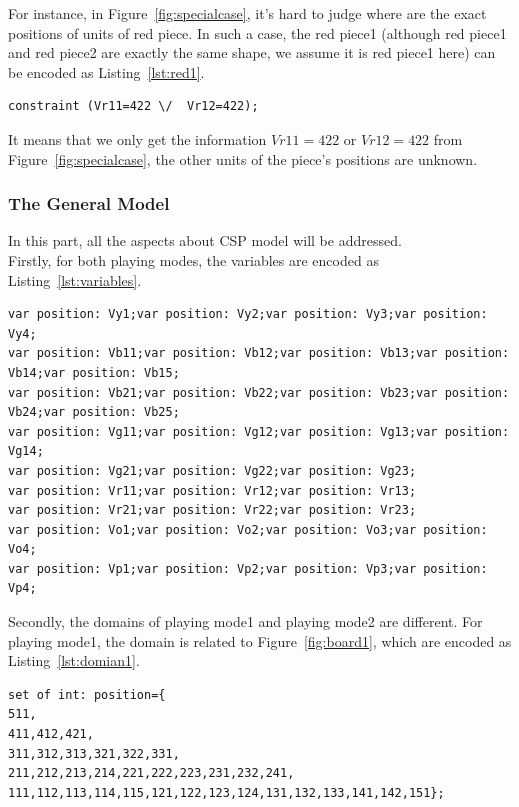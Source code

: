 For instance, in Figure~\ref{fig:specialcase}, it's hard to judge where are the exact positions of units of red piece. In such a case, the red piece1 (although red piece1 and red piece2 are exactly the same shape, we assume it is red piece1 here) can be encoded as Listing~\ref{lst:red1}.
\begin{lstlisting}[language=minizinc,numbers=none,caption={Encoding for red piece1's position of special problem},label={lst:red1}]
constraint (Vr11=422 \/  Vr12=422);
\end{lstlisting}
\bigskip
\smallbreak
It means that we only get the information $Vr11=422$ or $Vr12=422$ from Figure~\ref{fig:specialcase}, the other units of the piece's positions are unknown.
\subsubsection{The General Model}
In this part, all the aspects about CSP model will be addressed.
\\Firstly, for both playing modes, the variables are encoded as Listing~\ref{lst:variables}.
\begin{lstlisting}[language=minizinc,numbers=none,caption={Encoding for variables},label={lst:variables}]
var position: Vy1;var position: Vy2;var position: Vy3;var position: Vy4;
var position: Vb11;var position: Vb12;var position: Vb13;var position: Vb14;var position: Vb15;
var position: Vb21;var position: Vb22;var position: Vb23;var position: Vb24;var position: Vb25;
var position: Vg11;var position: Vg12;var position: Vg13;var position: Vg14;
var position: Vg21;var position: Vg22;var position: Vg23;
var position: Vr11;var position: Vr12;var position: Vr13;
var position: Vr21;var position: Vr22;var position: Vr23;
var position: Vo1;var position: Vo2;var position: Vo3;var position: Vo4;
var position: Vp1;var position: Vp2;var position: Vp3;var position: Vp4;
\end{lstlisting}
\bigskip
\smallbreak
Secondly, the domains of playing mode1 and playing mode2 are different. For playing mode1, the domain is related to Figure~\ref{fig:board1}, which are encoded as Listing~\ref{lst:domian1}.
\begin{lstlisting}[language=minizinc,numbers=none,caption={Encoding for the domain of playing mode1},label={lst:domian1}]
set of int: position={
511,
411,412,421,
311,312,313,321,322,331,
211,212,213,214,221,222,223,231,232,241,
111,112,113,114,115,121,122,123,124,131,132,133,141,142,151};
\end{lstlisting}
\bigskip
\smallbreak
